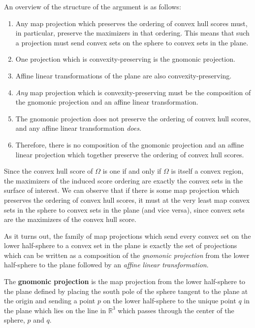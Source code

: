 An overview of the structure of the argument is as follows:
\begin{enumerate}
    \item Any map projection which preserves the ordering of convex hull scores must, in particular, preserve the maximizers in that ordering.  This means that such a projection must send convex sets on the sphere to convex sets in the plane.
    \item One projection which is convexity-preserving is the gnomonic projection.
    \item Affine linear transformations of the plane are also convexity-preserving.
    \item \textit{Any} map projection which is convexity-preserving must be the composition of the gnomonic projection and an affine linear transformation.
    \item The gnomonic projection does not preserve the ordering of convex hull scores, and any affine linear transformation \textit{does}.
    \item Therefore, there is no composition of the gnomonic projection and an affine linear projection which together preserve the ordering of convex hull scores.
\end{enumerate}



Since the convex hull score of $\Omega$ is one if and only if $\Omega$ is itself a convex region, the maximizers of the induced score ordering are exactly the convex sets in the surface of interest. We can observe that if there is some map projection which preserves the ordering of convex hull scores, it must at the very least map convex sets in the sphere to convex sets in the plane (and vice versa), since convex sets are the maximizers of the convex hull score.




As it turns out, the family of map projections which send every convex set on the lower half-sphere to a convex set in the plane is exactly the set of projections which can be written as a composition of the \textit{gnomonic projection} from the lower half-sphere to the plane followed by an \textit{affine linear transformation}.




\begin{definition}
	The \textbf{gnomonic projection} is the map projection from the lower half-sphere to the plane defined by placing the south pole of the sphere tangent to the plane at the origin and sending a point $p$ on the lower half-sphere to the unique point $q$ in the plane which lies on the line in $\mathbb{R}^3$ which passes through the center of the sphere, $p$ and $q$.
\end{definition}
	
